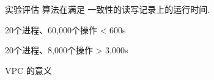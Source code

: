 \begin{frame}{实验评估}
  {\readcentric{} 算法在满足 \PRAM{} 一致性的读写记录上的运行时间.}

  \begin{description}
	\centering
	\item[\readcentric{}:] 20个进程、60,000个操作 < 600s
	\item[\rwclosure{}:] 20个进程、8,000个操作 > 3,000s
  \end{description}
\end{frame}
\begin{frame}{VPC 的意义}
\end{frame}
